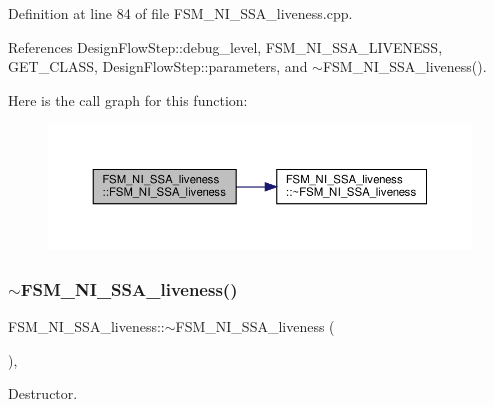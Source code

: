 Definition at line 84 of file F\+S\+M\+\_\+\+N\+I\+\_\+\+S\+S\+A\+\_\+liveness.\+cpp.



References Design\+Flow\+Step\+::debug\+\_\+level, F\+S\+M\+\_\+\+N\+I\+\_\+\+S\+S\+A\+\_\+\+L\+I\+V\+E\+N\+E\+SS, G\+E\+T\+\_\+\+C\+L\+A\+SS, Design\+Flow\+Step\+::parameters, and $\sim$\+F\+S\+M\+\_\+\+N\+I\+\_\+\+S\+S\+A\+\_\+liveness().

Here is the call graph for this function\+:
\nopagebreak
\begin{figure}[H]
\begin{center}
\leavevmode
\includegraphics[width=350pt]{d4/dd8/classFSM__NI__SSA__liveness_a52fd80199f84c554035ca0b2a50bf11e_cgraph}
\end{center}
\end{figure}
\mbox{\label{classFSM__NI__SSA__liveness_ad6fef7469f1ee413ab05d4ee208fc97e}} 
\subsubsection{\texorpdfstring{$\sim$\+F\+S\+M\+\_\+\+N\+I\+\_\+\+S\+S\+A\+\_\+liveness()}{~FSM\_NI\_SSA\_liveness()}}
{\footnotesize\ttfamily F\+S\+M\+\_\+\+N\+I\+\_\+\+S\+S\+A\+\_\+liveness\+::$\sim$\+F\+S\+M\+\_\+\+N\+I\+\_\+\+S\+S\+A\+\_\+liveness (\begin{DoxyParamCaption}{ }\end{DoxyParamCaption})\hspace{0.3cm}{\ttfamily [override]}, {\ttfamily [default]}}



Destructor. 



